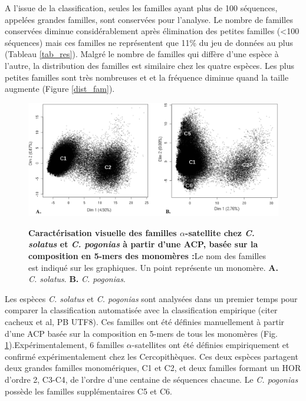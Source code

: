 \documentclass[12pt,a4paper]{article}
\begin{document}
	A l'issue de la classification, seules les familles ayant plus de 100 séquences, appelées grandes familles, sont conservées pour l'analyse. Le nombre de familles conservées diminue considérablement après élimination des petites familles (<100 séquences) mais ces familles ne représentent que 11\% du jeu de données au plus (Tableau \ref{tab_res}). Malgré le nombre de familles qui diffère d'une espèce à l'autre, la distribution des familles est similaire chez les quatre espèces. Les plus petites familles sont très nombreuses et et la fréquence diminue quand la taille augmente (Figure \ref{dist_fam}). 

		\begin{figure}	
			\includegraphics[scale=0.4]{img/ACP_experimental.png}  \\
			\caption{\textbf{Caractérisation visuelle des familles $\alpha$-satellite chez \textit{C. solatus} et \textit{C. pogonias} à partir d'une ACP, basée sur la composition en 5-mers des monomères :}Le nom des familles est indiqué sur les graphiques. Un point représente un monomère. \textbf{A.} \textit{C. solatus}. \textbf{B.} \textit{C. pogonias}.}
			\label{fig:ACP_exp} 
	\end{figure}	
	
	Les espèces \textit{C. solatus} et \textit{C. pogonias} sont analysées dans un premier temps pour comparer la classification automatisée avec la classification empirique (citer cacheux et al, PB UTF8). Ces familles ont été définies manuellement à partir d'une ACP basée sur la composition en 5-mers de tous les monomères (Fig. \ref{fig:ACP_exp}).Expérimentalement, 6 familles $\alpha$-satellites ont été définies empiriquement et confirmé expérimentalement chez les Cercopithèques. Ces deux espèces partagent deux grandes familles monomériques, C1 et C2, et deux familles formant un HOR d'ordre 2, C3-C4, de l'ordre d'une centaine de séquences chacune. Le \textit{C. pogonias} possède les familles supplémentaires C5 et C6.
	
\end{document}
